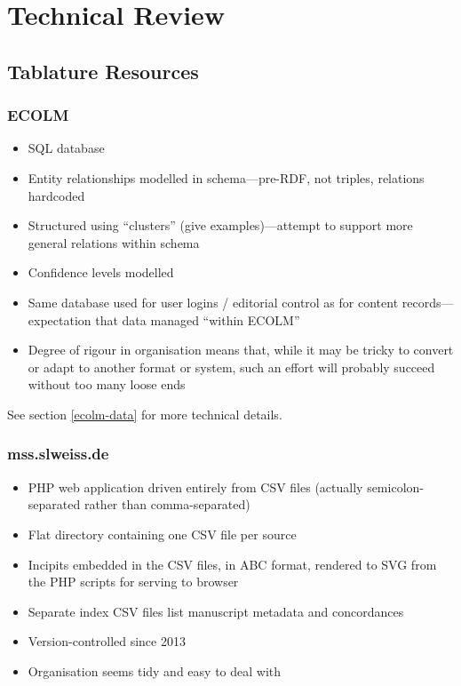 \documentclass[sigconf, nonacm=true]{acmart}
\begin{document}
\begin{sloppypar}
  \section{Technical Review}\label{technical}

  \subsection{Tablature Resources}
  
  \subsubsection{ECOLM}

  \begin{itemize}
  \item SQL database
  \item Entity relationships modelled in schema---pre-RDF, not
    triples, relations hardcoded
  \item Structured using ``clusters'' (give examples)---attempt to
    support more general relations within schema
  \item Confidence levels modelled
  \item Same database used for user logins / editorial control as for
    content records---expectation that data managed ``within ECOLM''
  \item Degree of rigour in organisation means that, while it may be
    tricky to convert or adapt to another format or system, such an
    effort will probably succeed without too many loose ends
  \end{itemize}

  See section \ref{ecolm-data} for more technical details.

  \subsubsection{mss.slweiss.de}

  \begin{itemize}
  \item PHP web application driven entirely from CSV files (actually
    semicolon-separated rather than comma-separated)
  \item Flat directory containing one CSV file per source
  \item Incipits embedded in the CSV files, in ABC format, rendered to
    SVG from the PHP scripts for serving to browser
  \item Separate index CSV files list manuscript metadata and
    concordances
  \item Version-controlled since 2013
  \item Organisation seems tidy and easy to deal with
  \end{itemize}
  

\end{sloppypar}
\end{document}
